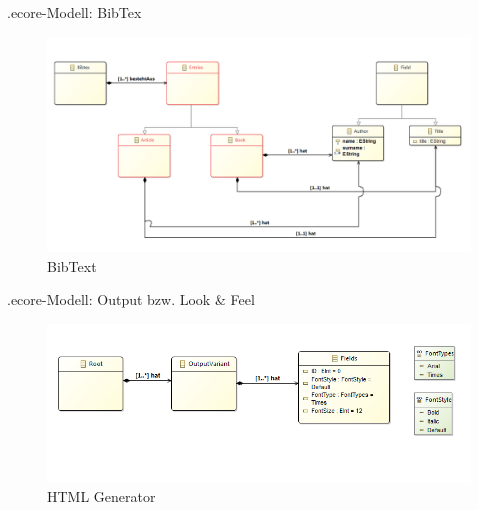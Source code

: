 \documentclass[fleqn,11pt,aspectratio=43]{beamer}
\begin{document}
\begin{frame}{.ecore-Modell: BibTex}
\begin{figure}
\includegraphics[scale=0.28]{../Images/FirstBibtexEcore.png} 
\caption{BibText}
\end{figure}  
\end{frame}

\begin{frame}{.ecore-Modell: Output bzw. Look \& Feel}
\begin{figure}
\includegraphics[scale=0.5]{../Images/FirstBibtexToHTMLEcore.png} 
\caption{HTML Generator}
\end{figure}   
\end{frame}
\end{document}
